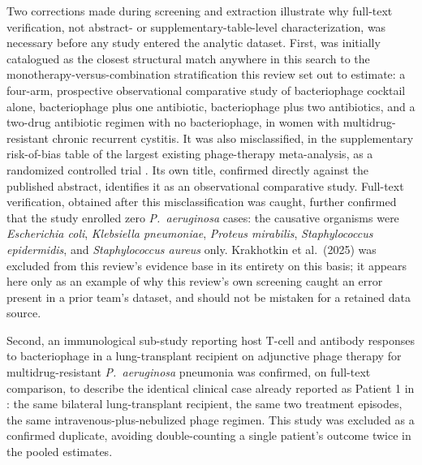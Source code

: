 Two corrections made during screening and extraction illustrate why full-text verification, not abstract- or supplementary-table-level characterization, was necessary before any study entered the analytic dataset. First, \textcite{Krakhotkin2025_currurol} was initially catalogued as the closest structural match anywhere in this search to the monotherapy-versus-combination stratification this review set out to estimate: a four-arm, prospective observational comparative study of bacteriophage cocktail alone, bacteriophage plus one antibiotic, bacteriophage plus two antibiotics, and a two-drug antibiotic regimen with no bacteriophage, in women with multidrug-resistant chronic recurrent cystitis. It was also misclassified, in the supplementary risk-of-bias table of the largest existing phage-therapy meta-analysis, as a randomized controlled trial \parencite{Liu2025_ijaa}. Its own title, confirmed directly against the published abstract, identifies it as an observational comparative study. Full-text verification, obtained after this misclassification was caught, further confirmed that the study enrolled zero \textit{P.\ aeruginosa} cases: the causative organisms were \textit{Escherichia coli}, \textit{Klebsiella pneumoniae}, \textit{Proteus mirabilis}, \textit{Staphylococcus epidermidis}, and \textit{Staphylococcus aureus} only. Krakhotkin et al.\ (2025) was excluded from this review's evidence base in its entirety on this basis; it appears here only as an example of why this review's own screening caught an error present in a prior team's dataset, and should not be mistaken for a retained data source.

Second, an immunological sub-study reporting host T-cell and antibody responses to bacteriophage in a lung-transplant recipient on adjunctive phage therapy for multidrug-resistant \textit{P.\ aeruginosa} pneumonia \parencite{Dan2023_jid} was confirmed, on full-text comparison, to describe the identical clinical case already reported as Patient 1 in \textcite{Aslam2019_ajt}: the same bilateral lung-transplant recipient, the same two treatment episodes, the same intravenous-plus-nebulized phage regimen. This study was excluded as a confirmed duplicate, avoiding double-counting a single patient's outcome twice in the pooled estimates.

